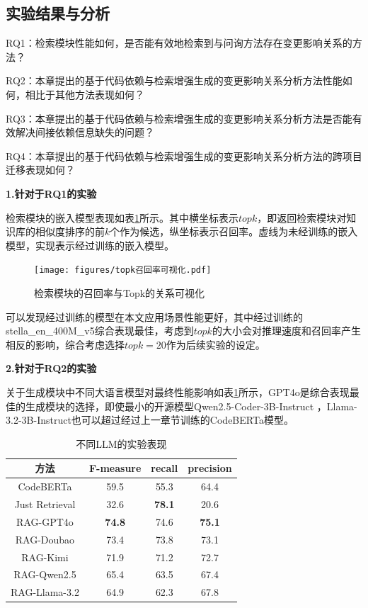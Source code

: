 \subsection{实验结果与分析}

RQ1：检索模块性能如何，是否能有效地检索到与问询方法存在变更影响关系的方法？

RQ2：本章提出的基于代码依赖与检索增强生成的变更影响关系分析方法性能如何，相比于其他方法表现如何？

RQ3：本章提出的基于代码依赖与检索增强生成的变更影响关系分析方法是否能有效解决间接依赖信息缺失的问题？

RQ4：本章提出的基于代码依赖与检索增强生成的变更影响关系分析方法的跨项目迁移表现如何？
 

\textbf{1.针对于RQ1的实验}

检索模块的嵌入模型表现如表\ref{1_检索模块的召回率与Topk的关系可视化}所示。其中横坐标表示$topk$，即返回检索模块对知识库的相似度排序的前$k$个作为候选，纵坐标表示召回率。虚线为未经训练的嵌入模型，实现表示经过训练的嵌入模型。


\begin{figure}[htbp]
\centering
\texttt{[image: figures/topk召回率可视化.pdf]}
\caption{检索模块的召回率与Topk的关系可视化}
\label{1_检索模块的召回率与Topk的关系可视化}
\end{figure}

可以发现经过训练的模型在本文应用场景性能更好，其中经过训练的stella\_en\_400M\_v5综合表现最佳，考虑到$topk$的大小会对推理速度和召回率产生相反的影响，综合考虑选择$topk=20$作为后续实验的设定。 

\textbf{2.针对于RQ2的实验}

关于生成模块中不同大语言模型对最终性能影响如表\ref{2_不同LLM的实验表现}所示，GPT4o是综合表现最佳的生成模块的选择，即使最小的开源模型Qwen2.5-Coder-3B-Instruct ，Llama-3.2-3B-Instruct也可以超过经过上一章节训练的CodeBERTa模型。

\begin{table}[htbp]
\caption{不同LLM的实验表现}
\label{2_不同LLM的实验表现}
\vspace{0.5em}\centering\wuhao
\begin{tabular}{cccc}
\toprule
方法 & F-measure & recall & precision  \\
\midrule
CodeBERTa & 59.5 & 55.3 & 64.4 \\
Just Retrieval & 32.6 & \textbf{78.1} & 20.6 \\
\midrule
RAG-GPT4o & \textbf{74.8} & 74.6 & \textbf{75.1} \\
RAG-Doubao & 73.4 & 73.8 & 73.1 \\
RAG-Kimi & 71.9 & 71.2 & 72.7 \\
RAG-Qwen2.5 & 65.4 & 63.5 & 67.4 \\
RAG-Llama-3.2 & 64.9 & 62.3 & 67.8 \\
\bottomrule
\end{tabular}
\end{table}


